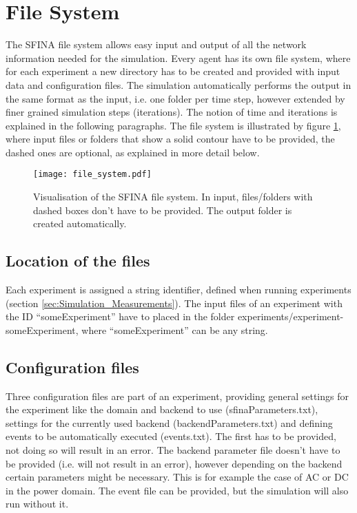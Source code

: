 \documentclass[11pt,fleqn]{book} %
\begin{document}

\section{File System}\label{sec:file_system}
The SFINA file system allows easy input and output of all the network information needed for the simulation. Every agent has its own file system, where for each experiment a new directory has to be created and provided with input data and configuration files. The simulation automatically performs the output in the same format as the input, i.e. one folder per time step, however extended by finer grained simulation steps (iterations). The notion of time and iterations is explained in the following paragraphs. The file system is illustrated by figure \ref{fig:file_system}, where input files or folders that show a solid contour have to be provided, the dashed ones are optional, as explained in more detail below.

\begin{figure}[h]
\centering\texttt{[image: file\_system.pdf]}
\caption{Visualisation of the SFINA file system. In input, files/folders with dashed boxes don't have to be provided. The output folder is created automatically.}
\label{fig:file_system}
\end{figure}

\subsection{Location of the files}
Each experiment is assigned a string identifier, defined when running experiments (section \ref{sec:Simulation_Measurements}). The input files of an experiment with the ID “someExperiment” have to placed in the folder experiments/experiment-someExperiment, where “someExperiment” can be any string.

\subsection{Configuration files}\label{subsec:config_files}
Three configuration files are part of an experiment, providing general settings for the experiment like the domain and backend to use (sfinaParameters.txt), settings for the currently used backend (backendParameters.txt) and defining events to be automatically executed (events.txt). The first has to be provided, not doing so will result in an error. The backend parameter file doesn’t have to be provided (i.e. will not result in an error), however depending on the backend certain parameters might be necessary. This is for example the case of AC or DC in the power domain. The event file can be provided, but the simulation will also run without it. 
\end{document}

